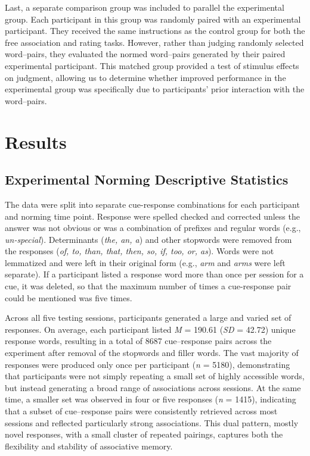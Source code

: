 \documentclass[
  man,floatsintext]{apa7}
\begin{document}
Last, a separate comparison group was included to parallel the
experimental group. Each participant in this group was randomly paired
with an experimental participant. They received the same instructions as
the control group for both the free association and rating tasks.
However, rather than judging randomly selected word--pairs, they
evaluated the normed word--pairs generated by their paired experimental
participant. This matched group provided a test of stimulus effects on
judgment, allowing us to determine whether improved performance in the
experimental group was specifically due to participants' prior
interaction with the word--pairs.

\section{Results}\label{results}

\subsection{Experimental Norming Descriptive Statistics}\label{experimental-norming-descriptive-statistics}

The data were split into separate cue-response combinations for each
participant and norming time point. Response were spelled checked and
corrected unless the answer was not obvious or was a combination of
prefixes and regular words (e.g., \emph{un-special}). Determinants (\emph{the, an,
a}) and other stopwords were removed from the responses (\emph{of, to, than,
that, then, so, if, too, or, as}). Words were not lemmatized and were
left in their original form (e.g., \emph{arm} and \emph{arms} were left separate).
If a participant listed a response word more than once per session for a
cue, it was deleted, so that the maximum number of times a cue-response
pair could be mentioned was five times.

Across all five testing sessions, participants generated a large and
varied set of responses. On average, each participant listed \emph{M} =
190.61 (\emph{SD} =
42.72) unique
response words, resulting in a total of 8687 cue--response
pairs across the experiment after removal of the stopwords and filler
words. The vast majority of responses were produced only once per
participant (\emph{n} = 5180), demonstrating that participants
were not simply repeating a small set of highly accessible words, but
instead generating a broad range of associations across sessions. At the
same time, a smaller set was observed in four or five responses (\emph{n} =
1415), indicating that a subset of cue--response pairs were
consistently retrieved across most sessions and reflected particularly
strong associations. This dual pattern, mostly novel responses, with a
small cluster of repeated pairings, captures both the flexibility and
stability of associative memory.
\end{document}

